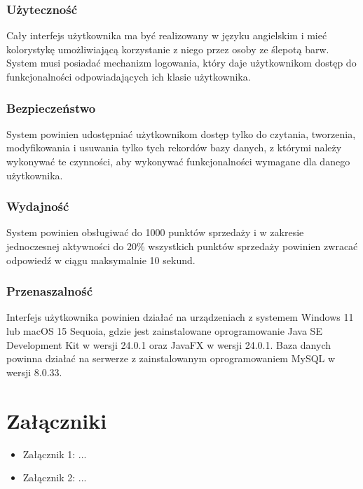 \documentclass[a4paper,12pt]{article}
\begin{document}
\subsubsection{Użyteczność}

Cały interfejs użytkownika ma być realizowany w języku angielskim i mieć kolorystykę umożliwiającą korzystanie z niego przez osoby ze ślepotą barw.
System musi posiadać mechanizm logowania, który daje użytkownikom dostęp do funkcjonalności odpowiadających ich klasie użytkownika.

\subsubsection{Bezpieczeństwo}

System powinien udostępniać użytkownikom dostęp tylko do czytania, tworzenia, modyfikowania i usuwania tylko tych rekordów bazy danych, z którymi należy wykonywać te czynności, aby wykonywać funkcjonalności wymagane dla danego użytkownika.

\subsubsection{Wydajność}

System powinien obsługiwać do 1000 punktów sprzedaży i w zakresie jednoczesnej aktywności do 20\% wszystkich punktów sprzedaży powinien zwracać odpowiedź w ciągu maksymalnie 10 sekund.

\subsubsection{Przenaszalność}

Interfejs użytkownika powinien działać na urządzeniach z systemem Windows 11 lub macOS 15 Sequoia, gdzie jest zainstalowane oprogramowanie Java SE Development Kit w wersji 24.0.1 oraz JavaFX w wersji 24.0.1.
Baza danych powinna działać na serwerze z zainstalowanym oprogramowaniem MySQL w wersji 8.0.33.

\section{Załączniki}

\begin{itemize}
    \item Załącznik 1: ...
    \item Załącznik 2: ...
\end{itemize}
\end{document}
